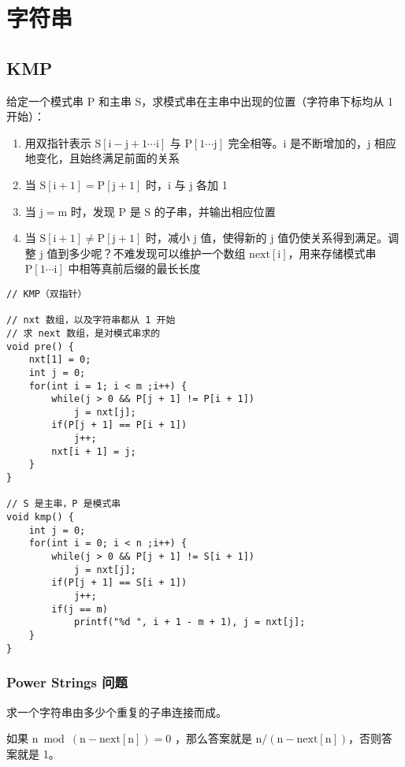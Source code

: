 \documentclass[UTF8]{article}
\begin{document}
\newpage
\section{字符串}

\subsection{KMP}
给定一个模式串 $\mathrm{P}$ 和主串 $\mathrm{S}$，求模式串在主串中出现的位置（字符串下标均从 1 开始）：

\begin{enumerate}
	\item 用双指针表示 $\mathrm{S[i-j+1\cdots i]}$ 与 $\mathrm{P[1 \cdots j]}$ 完全相等。$\mathrm{i}$ 是不断增加的，$\mathrm{j}$ 相应地变化，且始终满足前面的关系
	\item 当 $\mathrm{S[i+1] = P[j+1]}$ 时，$\mathrm{i}$ 与 $\mathrm{j}$ 各加 1
	\item 当 $\mathrm{j=m}$ 时，发现 $\mathrm{P}$ 是 $\mathrm{S}$ 的子串，并输出相应位置
	\item 当 $\mathrm{S[i + 1] \neq P[j+1]}$ 时，减小 $\mathrm{j}$ 值，使得新的 $\mathrm{j}$ 值仍使关系得到满足。调整 $\mathrm{j}$ 值到多少呢？不难发现可以维护一个数组 $\mathrm{next[i]}$，用来存储模式串 $\mathrm{P[1 \cdots i]}$ 中相等真前后缀的最长长度
\end{enumerate}

\begin{lstlisting}[caption=KMP]
// KMP（双指针）

// nxt 数组，以及字符串都从 1 开始
// 求 next 数组，是对模式串求的
void pre() {
	nxt[1] = 0;
	int j = 0;
	for(int i = 1; i < m ;i++) {
		while(j > 0 && P[j + 1] != P[i + 1])
			j = nxt[j];
		if(P[j + 1] == P[i + 1])
			j++;
		nxt[i + 1] = j; 
	}
}

// S 是主串，P 是模式串
void kmp() {
	int j = 0;
	for(int i = 0; i < n ;i++) {
		while(j > 0 && P[j + 1] != S[i + 1])
			j = nxt[j];
		if(P[j + 1] == S[i + 1])
			j++;
		if(j == m)
			printf("%d ", i + 1 - m + 1), j = nxt[j];
	}
}
\end{lstlisting}


\subsubsection{Power Strings 问题}
求一个字符串由多少个重复的子串连接而成。

如果 $\mathrm{n \bmod (n - next[n]) = 0}$  ，那么答案就是 $\mathrm{n / (n - next[n])}$，否则答案就是 1。
\end{document}
